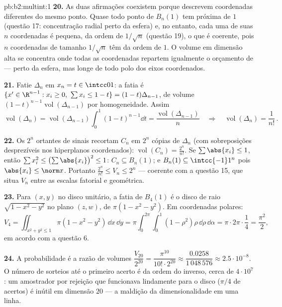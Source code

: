 \begin{solution}{pb:b2:multint:1}
\textbf{20.} As duas afirmações coexistem porque descrevem
coordenadas diferentes do mesmo ponto. Quase todo ponto
de $B_n(1)$ tem  próxima de $1$ (questão 17: concentração
radial perto da esfera) e, no entanto, cada uma de suas $n$
coordenadas é pequena, da ordem de $1/\sqrt n$ (questão 19),
o que é coerente, pois $n$ coordenadas de tamanho $1/\sqrt n$
têm  da ordem de $1$. O volume em dimensão alta se concentra
onde todas as coordenadas repartem igualmente o orçamento de  ---
perto da esfera, mas longe de todo polo dos eixos coordenados.

\textbf{21.} Fatie $\Delta_n$ em $x_n = t \in \intcc01$: a
fatia é $\{x' \in \R^{n-1} : x_i \geq 0,\ \sum x_i \leq 1 -
t\} = (1-t)\Delta_{n-1}$, de volume
$(1-t)^{n-1}\operatorname{vol}(\Delta_{n-1})$ por homogeneidade.
Assim
\[
\operatorname{vol}(\Delta_n) =
\operatorname{vol}(\Delta_{n-1})\int_0^1(1 - t)^{n-1}\dd t =
\frac{\operatorname{vol}(\Delta_{n-1})}{n}
\quad\Longrightarrow\quad
\operatorname{vol}(\Delta_n) = \frac1{n!}\,.
\]

\textbf{22.} Os $2^n$ ortantes de sinais recortam $C_n$ em $2^n$
cópias de $\Delta_n$ (com sobreposições desprezíveis nos hiperplanos
coordenados): $\operatorname{vol}(C_n) = \frac{2^n}{n!}$. Se
$\sum\abs{x_i} \leq 1$, então $\sum x_i^2 \leq
\bigl(\sum\abs{x_i}\bigr)^2 \leq 1$: $C_n \subseteq B_n(1)$;
e $B_n(1) \subseteq \intcc{-1}1^n$ pois $\abs{x_i} \leq
\norm x$. Portanto $\frac{2^n}{n!} \leq V_n \leq 2^n$ ---
coerente com a questão 15, que situa $V_n$ entre as
escalas fatorial e geométrica.

\textbf{23.} Para $(x, y)$ no disco unitário, a fatia de
$B_4(1)$ é o disco de raio $\sqrt{1 - x^2 - y^2}$ no
plano $(z, w)$, de  $\pi(1 - x^2 - y^2)$. Em coordenadas
polares:
\[
V_4 = \iint_{x^2+y^2\leq1}\pi(1 - x^2 - y^2)\,\dd x\,\dd y
= \pi\int_0^{2\pi}\!\!\int_0^1(1 - \rho^2)\rho\,
\dd\rho\,\dd\alpha
= \pi\cdot2\pi\cdot\frac14 = \frac{\pi^2}2 ,
\]
em acordo com a questão 6.

\textbf{24.} A probabilidade é a razão de volumes
$\dfrac{V_{20}}{2^{20}} = \dfrac{\pi^{10}}{10!\cdot2^{20}}
\approx \dfrac{0.0258}{1\,048\,576} \approx
2.5\cdot10^{-8}$. O número de sorteios até o primeiro acerto é
da ordem do inverso, cerca de $4\cdot10^7$: um amostrador por rejeição
que funcionava lindamente para o disco ($\pi/4$ de acertos) é
inútil em dimensão $20$ --- a maldição da dimensionalidade em
uma linha.


\end{solution}
